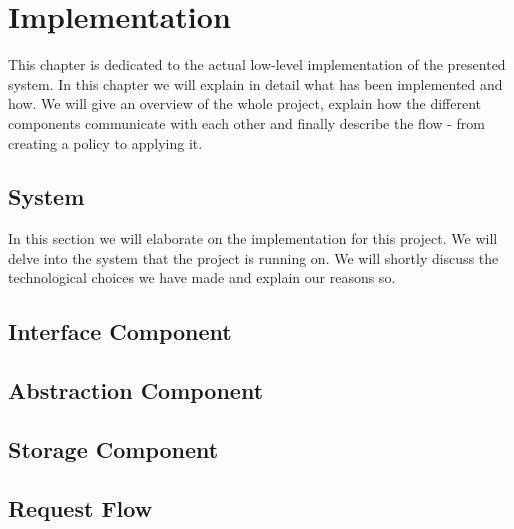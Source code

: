 \section{Implementation}
This chapter is dedicated to the actual low-level implementation of the presented system. In this chapter we will explain in detail what has been implemented and how. We will give an overview of the whole project, explain how the different components communicate with each other and finally describe the flow - from creating a policy to applying it. 

\subsection{System}
In this section we will elaborate on the implementation for this project. We will delve into the system that the project is running on. We will shortly discuss the technological choices we have made and explain our reasons so.



\subsection{Interface Component}

\subsection{Abstraction Component}

\subsection{Storage Component}

\subsection{Request Flow}